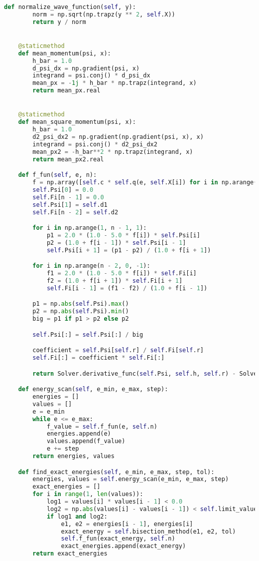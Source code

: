 \begin{lstlisting}[language=Python, caption=Код файла solver.py,label={lst:solver}]
    def normalize_wave_function(self, y):
        norm = np.sqrt(np.trapz(y ** 2, self.X))
        return y / norm


    @staticmethod
    def mean_momentum(psi, x):
        h_bar = 1.0
        d_psi_dx = np.gradient(psi, x)
        integrand = psi.conj() * d_psi_dx
        mean_px = -1j * h_bar * np.trapz(integrand, x)
        return mean_px.real


    @staticmethod
    def mean_square_momentum(psi, x):
        h_bar = 1.0
        d2_psi_dx2 = np.gradient(np.gradient(psi, x), x)
        integrand = psi.conj() * d2_psi_dx2
        mean_px2 = -h_bar**2 * np.trapz(integrand, x)
        return mean_px2.real

    def f_fun(self, e, n):
        f = np.array([self.c * self.q(e, self.X[i]) for i in np.arange(n)])
        self.Psi[0] = 0.0
        self.Fi[n - 1] = 0.0
        self.Psi[1] = self.d1
        self.Fi[n - 2] = self.d2

        for i in np.arange(1, n - 1, 1):
            p1 = 2.0 * (1.0 - 5.0 * f[i]) * self.Psi[i]
            p2 = (1.0 + f[i - 1]) * self.Psi[i - 1]
            self.Psi[i + 1] = (p1 - p2) / (1.0 + f[i + 1])

        for i in np.arange(n - 2, 0, -1):
            f1 = 2.0 * (1.0 - 5.0 * f[i]) * self.Fi[i]
            f2 = (1.0 + f[i + 1]) * self.Fi[i + 1]
            self.Fi[i - 1] = (f1 - f2) / (1.0 + f[i - 1])

        p1 = np.abs(self.Psi).max()
        p2 = np.abs(self.Psi).min()
        big = p1 if p1 > p2 else p2

        self.Psi[:] = self.Psi[:] / big

        coefficient = self.Psi[self.r] / self.Fi[self.r]
        self.Fi[:] = coefficient * self.Fi[:]

        return Solver.derivative_func(self.Psi, self.h, self.r) - Solver.derivative_func(self.Fi, self.h, self.r)

    def energy_scan(self, e_min, e_max, step):
        energies = []
        values = []
        e = e_min
        while e <= e_max:
            f_value = self.f_fun(e, self.n)
            energies.append(e)
            values.append(f_value)
            e += step
        return energies, values

    def find_exact_energies(self, e_min, e_max, step, tol):
        energies, values = self.energy_scan(e_min, e_max, step)
        exact_energies = []
        for i in range(1, len(values)):
            log1 = values[i] * values[i - 1] < 0.0
            log2 = np.abs(values[i] - values[i - 1]) < self.limit_value
            if log1 and log2:
                e1, e2 = energies[i - 1], energies[i]
                exact_energy = self.bisection_method(e1, e2, tol)
                self.f_fun(exact_energy, self.n)
                exact_energies.append(exact_energy)
        return exact_energies


\end{lstlisting}
